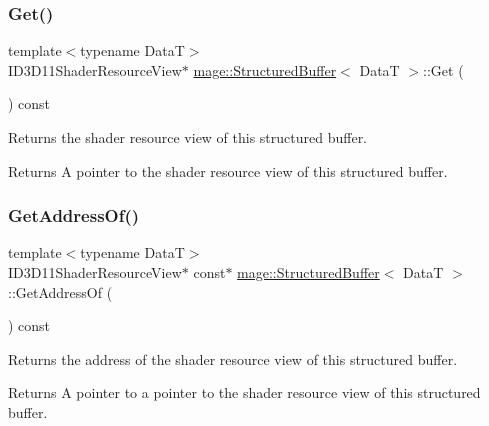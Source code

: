 \subsubsection{\texorpdfstring{Get()}{Get()}}
{\footnotesize\ttfamily template$<$typename DataT$>$ \\
I\+D3\+D11\+Shader\+Resource\+View$\ast$ \hyperlink{structmage_1_1_structured_buffer}{mage\+::\+Structured\+Buffer}$<$ DataT $>$\+::Get (\begin{DoxyParamCaption}{ }\end{DoxyParamCaption}) const\hspace{0.3cm}{\ttfamily [noexcept]}}

Returns the shader resource view of this structured buffer.

\begin{DoxyReturn}{Returns}
A pointer to the shader resource view of this structured buffer. 
\end{DoxyReturn}
\hypertarget{structmage_1_1_structured_buffer_a116faa593af2b0872cb266eabe6b58a8}{}\label{structmage_1_1_structured_buffer_a116faa593af2b0872cb266eabe6b58a8} 
\subsubsection{\texorpdfstring{Get\+Address\+Of()}{GetAddressOf()}\hspace{0.1cm}{\footnotesize\ttfamily [1/2]}}
{\footnotesize\ttfamily template$<$typename DataT$>$ \\
I\+D3\+D11\+Shader\+Resource\+View$\ast$ const$\ast$ \hyperlink{structmage_1_1_structured_buffer}{mage\+::\+Structured\+Buffer}$<$ DataT $>$\+::Get\+Address\+Of (\begin{DoxyParamCaption}{ }\end{DoxyParamCaption}) const\hspace{0.3cm}{\ttfamily [noexcept]}}

Returns the address of the shader resource view of this structured buffer.

\begin{DoxyReturn}{Returns}
A pointer to a pointer to the shader resource view of this structured buffer. 
\end{DoxyReturn}
\hypertarget{structmage_1_1_structured_buffer_a1e05bab8441b847c5b7cd11e2f5003e7}{}\label{structmage_1_1_structured_buffer_a1e05bab8441b847c5b7cd11e2f5003e7} 
